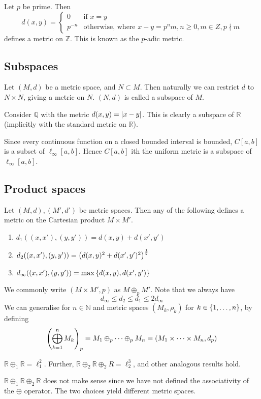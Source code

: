 \begin{example}
	Let \( p \) be prime.
	Then
	\[
		d(x,y) = \begin{cases}
			0      & \text{if } x = y                                                     \\
			p^{-n} & \text{otherwise, where } x - y = p^n m, n \geq 0, m \in Z, p \nmid m
		\end{cases}
	\]
	defines a metric on \( \mathbb Z \).
	This is known as the \( p \)-adic metric.
\end{example}

\subsection{Subspaces}
Let \( (M, d) \) be a metric space, and \( N \subset M \).
Then naturally we can restrict \( d \) to \( N \times N \), giving a metric on \( N \).
\( (N, d) \) is called a subspace of \( M \).
\begin{example}
	Consider \( \mathbb Q \) with the metric \( d(x,y) = \abs{x-y} \).
	This is clearly a subspace of \( \mathbb R \) (implicitly with the standard metric on \( \mathbb R \)).
\end{example}
\begin{example}
	Since every continuous function on a closed bounded interval is bounded, \( C[a,b] \) is a subset of \( \ell_\infty[a,b] \).
	Hence \( C[a,b] \) ith the uniform metric is a subspace of \( \ell_\infty[a,b] \).
\end{example}

\subsection{Product spaces}
Let \( (M, d), (M', d') \) be metric spaces.
Then any of the following defines a metric on the Cartesian product \( M \times M' \).
\begin{enumerate}
	\item \( d_1 ((x,x'), (y,y')) = d(x,y) + d(x',y') \)
	\item \( d_2 ((x,x'), (y,y')) = \qty(d(x,y)^2 + d(x',y')^2)^{\frac{1}{2}} \)
	\item \( d_\infty ((x,x'), (y,y')) = \max\qty{ d(x,y), d(x',y') } \)
\end{enumerate}
We commonly write \( (M \times M', p) \) as \( M \oplus_p M' \).
Note that we always have
\[
	d_\infty \leq d_2 \leq d_1 \leq 2 d_\infty
\]
We can generalise for \( n \in \mathbb N \) and metric spaces \( (M_k, \rho_k) \) for \( k \in \qty{1,\dots,n} \), by defining
\[
	\qty( \bigoplus_{k=1}^n M_k )_p = M_1 \oplus_p \dots \oplus_p M_n = \qty( M_1 \times \dots \times M_n, d_p )
\]
\begin{example}
	\( \mathbb R \oplus_1 \mathbb R = \ell_1^2 \).
	Further, \( \mathbb R \oplus_2 \mathbb R \oplus_2 R = \ell_2^3 \), and other analogous results hold.
\end{example}
\begin{remark}
	\( \mathbb R \oplus_1 \mathbb R \oplus_2 \mathbb R \) does not make sense since we have not defined the associativity of the \( \oplus \) operator.
	The two choices yield different metric spaces.
\end{remark}

